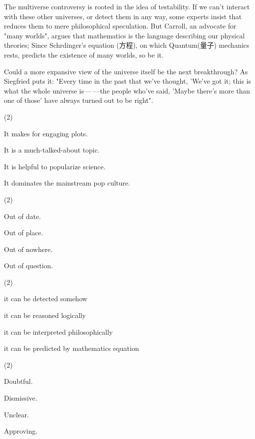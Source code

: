 \documentclass{英语试卷}
\begin{document}
\par The multiverse controversy is rooted in the idea of testability. If we can't interact with these other universes, or detect them in any way, some experts insist that reduces them to mere philosophical speculation. But Carroll, an advocate for "many worlds", argues that mathematics is the language describing our physical theories; Since Schrdinger's equation (方程), on which Quantum(量子) mechanics rests, predicts the existence of many worlds, so be it.\par
\par Could a more expansive view of the universe itself be the next breakthrough? As Siegfried puts it: "Every time in the past that we've thought, 'We've got it; this is what the whole universe is— —the people who've said, 'Maybe there's more than one of those' have always turned out to be right".\par
{}
\begin{choices}(2)
  \item It makes for engaging plots.
  \item It is a much-talked-about topic.
  \item It is helpful to popularize science.
  \item It dominates the mainstream pop culture.
\end{choices}
\begin{choices}(2)
  \item Out of date.
  \item Out of place.
  \item Out of nowhere.
  \item Out of question.
\end{choices}
\begin{choices}(2)
  \item it can be detected somehow
  \item it can be reasoned logically
  \item it can be interpreted philosophically
  \item it can be predicted by mathematics equation
\end{choices}
\begin{choices}(2)
  \item Doubtful.
  \item Dismissive.
  \item Unclear.
  \item Approving.
\end{choices}
\end{document}
